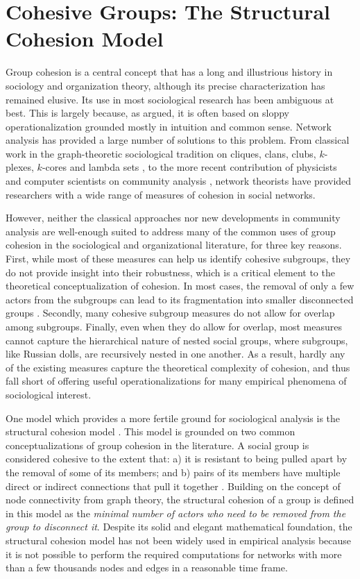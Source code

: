 
\chapter{Cohesive Groups: The Structural Cohesion Model}

Group cohesion is a central concept that has a long and illustrious history in sociology and organization theory, although its precise characterization has remained elusive. Its use in most sociological research has been ambiguous at best. This is largely because, as \citet{moody:2003} argued, it is often based on sloppy operationalization grounded mostly in intuition and common sense. Network analysis has provided a large number of solutions to this problem. From classical work in the graph-theoretic sociological tradition on cliques, clans, clubs, $k$-plexes, $k$-cores and lambda sets \citep[chapter 8]{wasserman:1994}, to the more recent contribution of physicists and computer scientists on community analysis \citep{fortunato:2010}, network theorists have provided researchers with a wide range of measures of cohesion in social networks.

However, neither the classical approaches nor new developments in community analysis are well-enough suited to address many of the common uses of group cohesion in the sociological and organizational literature, for three key reasons. First, while most of these measures can help us identify cohesive subgroups, they do not provide insight into their robustness, which is a critical element to the theoretical conceptualization of cohesion. In most cases, the removal of only a few actors from the subgroups can lead to its fragmentation into smaller disconnected groups \citep{white:2001}. Secondly, many cohesive subgroup measures do not allow for overlap among subgroups. Finally, even when they do allow for overlap, most measures cannot capture the hierarchical nature of nested social groups, where subgroups, like Russian dolls, are recursively nested in one another. As a result, hardly any of the existing measures capture the theoretical complexity of cohesion, and thus fall short of offering useful operationalizations for many empirical phenomena of sociological interest.

One model which provides a more fertile ground for sociological analysis is the structural cohesion model \citep{white:2001,moody:2003}. This model is grounded on two common conceptualizations of group cohesion in the literature. A social group is considered cohesive to the extent that: a) it is resistant to being pulled apart by the removal of some of its members; and b) pairs of its members have multiple direct or indirect connections that pull it together \citep[309-310]{white:2001}. Building on the concept of node connectivity from graph theory, the structural cohesion of a group is defined in this model as the \emph{minimal number of actors who need to be removed from the group to disconnect it}. Despite its solid and elegant mathematical foundation, the structural cohesion model has not been widely used in empirical analysis because it is not possible to perform the required computations for networks with more than a few thousands nodes and edges in a reasonable time frame.

